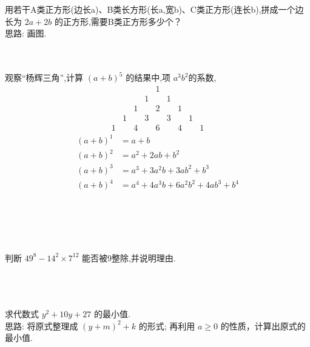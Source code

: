 \item {
    用若干A类正方形(边长a)、B类长方形(长a,宽b)、C类正方形(连长b),拼成一个边长为 $2a + 2b$ 的正方形,需要B类正方形多少个？
    \ifshowSolution
        \fangsong{}
        \\
        思路: 画图.
    \else
        \\ \\ \\
    \fi
}

\item {
    观察``杨辉三角'',计算 $(a+b)^5$ 的结果中,项 $a^3b^2$的系数,
    \[
    \begin{matrix}
        & & & & 1 & & & \\
        & & & 1 & & 1 & & \\
        & & 1 & & 2 & & 1 & \\
        & 1 & & 3 & & 3 & & 1 \\
        1 & & 4 & & 6 & & 4 & & 1
    \end{matrix}
    \]
    \begin{align*}
        (a+b)^1 &= a+b \\
        (a+b)^2 &= a^2 + 2ab + b^2 \\
        (a+b)^3 &= a^3 + 3a^2b + 3ab^2 + b^3 \\
        (a+b)^4 &= a^4 + 4a^3b + 6a^2b^2 + 4ab^3 + b^4 \\
    \end{align*}
    \ifshowSolution
        \fangsong{}
        \\
    \else
        \\ \\ \\
    \fi
}

\item {
    判断 $49^8 - 14^2\times 7^{12}$ 能否被9整除,并说明理由.
    \ifshowSolution
        \fangsong{}
        \\
    \else
        \\ \\ \\
    \fi
}

\item {
    求代数式 $y^2 +10y + 27$ 的最小值.
    \ifshowSolution
        \fangsong{}
        \\
        思路: 将原式整理成 $(y + m)^2 + k$ 的形式; 再利用 $a \geq 0$ 的性质，计算出原式的最小值.
    \else
        \\ \\ \\
    \fi
}

